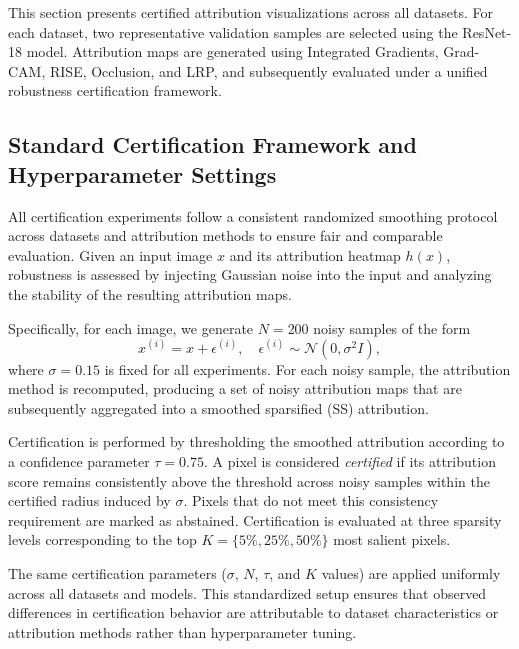 \documentclass[11pt]{article}
\begin{document}
This section presents certified attribution visualizations across all datasets. For each dataset, two representative validation samples are selected using the ResNet-18 model. Attribution maps are generated using Integrated Gradients, Grad-CAM, RISE, Occlusion, and LRP, and subsequently evaluated under a unified robustness certification framework.

\subsection{Standard Certification Framework and Hyperparameter Settings}

All certification experiments follow a consistent randomized smoothing protocol across datasets and attribution methods to ensure fair and comparable evaluation. Given an input image $x$ and its attribution heatmap $h(x)$, robustness is assessed by injecting Gaussian noise into the input and analyzing the stability of the resulting attribution maps.

Specifically, for each image, we generate $N = 200$ noisy samples of the form
\[
x^{(i)} = x + \epsilon^{(i)}, \quad \epsilon^{(i)} \sim \mathcal{N}(0, \sigma^2 I),
\]
where $\sigma = 0.15$ is fixed for all experiments. For each noisy sample, the attribution method is recomputed, producing a set of noisy attribution maps that are subsequently aggregated into a smoothed sparsified (SS) attribution.

Certification is performed by thresholding the smoothed attribution according to a confidence parameter $\tau = 0.75$. A pixel is considered \emph{certified} if its attribution score remains consistently above the threshold across noisy samples within the certified radius induced by $\sigma$. Pixels that do not meet this consistency requirement are marked as abstained. Certification is evaluated at three sparsity levels corresponding to the top $K=\{5\%, 25\%, 50\%\}$ most salient pixels.

The same certification parameters ($\sigma$, $N$, $\tau$, and $K$ values) are applied uniformly across all datasets and models. This standardized setup ensures that observed differences in certification behavior are attributable to dataset characteristics or attribution methods rather than hyperparameter tuning.
\end{document}
